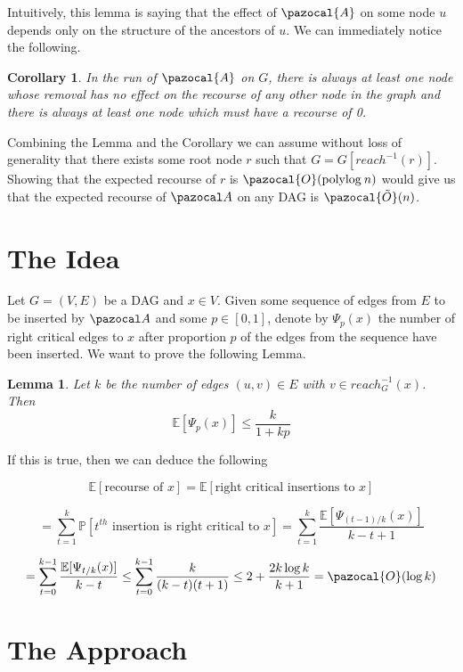 \documentclass{article}
\newtheorem{lemma}{Lemma}
\newtheorem{corollary}{Corollary}
\begin{document}
Intuitively, this lemma is saying that the effect of $\pazocal{A}$ on some node $u$ depends only on the structure of the ancestors of $u$. We can immediately notice the following.

\begin{corollary}
In the run of $\pazocal{A}$ on $G$, there is always at least one node whose removal has no effect on the recourse of any other node in the graph and there is always at least one node which must have a recourse of 0.
\end{corollary}

Combining the Lemma and the Corollary we can assume without loss of generality that there exists some root node $r$ such that $G = G[reach^{-1}(r)]$. Showing that the expected recourse of $r$ is $\pazocal{O}(\textrm{polylog} \: n)$ would give us that the expected recourse of $\pazocal A$ on any DAG is $\pazocal{\tilde O}(n)$. 

\section{The Idea}

Let $G=(V,E)$ be a DAG and $x \in V$. Given some sequence of edges from $E$ to be inserted by $\pazocal A$ and some $p \in [0,1]$, denote by $\Psi_p(x)$ the number of right critical edges to $x$ after proportion $p$ of the edges from the sequence have been inserted. We want to prove the following Lemma.

\begin{lemma}

Let $k$ be the number of edges $(u,v) \in E$ with $v \in reach^{-1}_G(x)$. Then
\[ \mathbb{E}[\Psi_p(x)] \leq \frac{k}{1+kp} \]
\end{lemma}

If this is true, then we can deduce the following

\[ \mathbb{E}[\textrm{recourse of $x$}] = \mathbb{E}[\textrm{right critical insertions to $x$}]  \]

\[ = \sum_{t=1}^k \mathbb{P}[\textrm{$t^{th}$ insertion is right critical to $x$}]  = \sum_{t=1}^k \frac{\mathbb{E}[\Psi_{(t-1)/k}(x)]}{k-t+1}  \]

\[= \sum_{t=0}^{k-1} \frac{\mathbb{E}[\Psi_{t/k}(x)]}{k-t} \leq \sum_{t=0}^{k-1} \frac{k}{(k-t)(t+1)} \leq 2+\frac{2k \log k}{k+1} = \pazocal{O} (\log k) \]

\section{The Approach}
\end{document}
